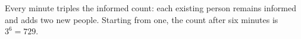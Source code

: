 Every minute triples the informed count: each existing person remains informed and adds two new people. Starting from one, the count after six minutes is $3^6=\boxed{729}$.

